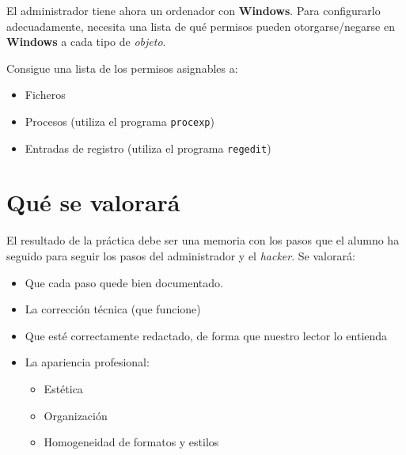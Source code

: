 \begin{homeworkProblem}

  \begin{multicols}{2}

    \null \vfill
    \begin{Actividad}
      El administrador tiene ahora un ordenador con \textbf{Windows}. Para configurarlo adecuadamente, necesita  una lista de qué permisos pueden otorgarse/negarse en \textbf{Windows} a cada tipo de \textit{objeto}.
    \end{Actividad}
    \vfill \null
    \columnbreak



    \begin{Actividad}
      Consigue una lista de los permisos asignables a:
      \begin{itemize}
      \item Ficheros
      \item Procesos (utiliza el programa \texttt{procexp})
      \item Entradas de registro (utiliza el programa \texttt{regedit})
      \end{itemize}
    \end{Actividad}

  \end{multicols}

  

\end{homeworkProblem}



\section{Qué se valorará}
El resultado de la práctica debe ser una memoria con los pasos que el alumno ha seguido para seguir los pasos del administrador y el \textit{hacker}. Se valorará:
\begin{itemize}
\item Que cada paso quede bien documentado. 
\item La corrección técnica (que funcione)
\item Que esté correctamente redactado, de forma que nuestro lector lo entienda 
\item La apariencia profesional:
  \begin{itemize}
  \item Estética
  \item Organización
  \item Homogeneidad de formatos y estilos
  \end{itemize}
\end{itemize}

